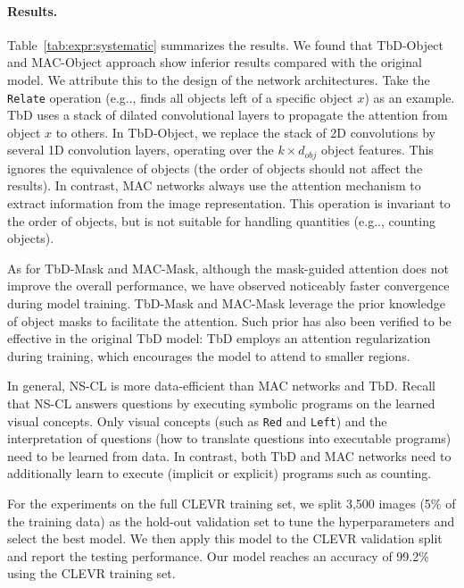 \documentclass{article} \usepackage{iclr2019_conference,times}
\makeatletter
\DeclareRobustCommand\onedot{\futurelet\@let@token\@onedot}
\def\@onedot{\ifx\@let@token.\else.\null\fi\xspace}
\def\eg{e.g\onedot} \def\Eg{E.g\onedot}
\newcommand{\model}{NS-CL\xspace}
\makeatother
\begin{document}
{\paragraph{Results. } Table~\ref{tab:expr:systematic} summarizes the results. We found that TbD-Object and MAC-Object approach show inferior results compared with the original model. We attribute this to the design of the network architectures. Take the {\tt Relate} operation (\eg, finds all objects left of a specific object $x$) as an example. TbD uses a stack of dilated convolutional layers to propagate the attention from object $x$ to others. In TbD-Object, we replace the stack of 2D convolutions by several 1D convolution layers, operating over the $k \times d_{obj}$ object features. This ignores the equivalence of objects (the order of objects should not affect the results). In contrast, MAC networks always use the attention mechanism to extract information from the image representation. This operation is invariant to the order of objects, but is not suitable for handling quantities (\eg, counting objects).

As for TbD-Mask and MAC-Mask, although the mask-guided attention does not improve the overall performance, we have observed noticeably faster convergence during model training. TbD-Mask and MAC-Mask leverage the prior knowledge of object masks to facilitate the attention. Such prior has also been verified to be effective in the original TbD model: TbD employs an attention regularization during training, which encourages the model to attend to smaller regions.

In general, \model is more data-efficient than MAC networks and TbD. Recall that \model answers questions by executing symbolic programs on the learned visual concepts. Only visual concepts (such as \texttt{Red} and \texttt{Left}) and the interpretation of questions (how to translate questions into executable programs) need to be learned from data. In contrast, both TbD and MAC networks need to additionally learn to execute (implicit or explicit) programs such as counting.

For the experiments on the full CLEVR training set, we split 3,500 images (5\% of the training data) as the hold-out validation set to tune the hyperparameters and select the best model. We then apply this model to the CLEVR validation split and report the testing performance. Our model reaches an accuracy of 99.2\% using the CLEVR training set.





}
\end{document}
